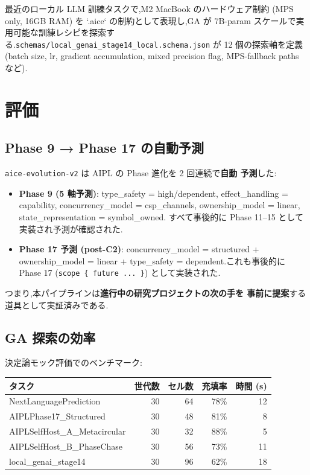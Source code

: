 \documentclass[11pt,a4paper]{article}
\newcommand{\code}[1]{\texttt{\small #1}}
\begin{document}
最近のローカル LLM 訓練タスクで,M2 MacBook のハードウェア制約
(MPS only, 16GB RAM) を `.aice` の制約として表現し,GA が 7B-param
スケールで実用可能な訓練レシピを探索する.\code{schemas/local\_genai\_stage14\_local.schema.json}
が 12 個の探索軸を定義 (batch size, lr, gradient accumulation,
mixed precision flag, MPS-fallback paths など).

\section{評価}
\label{sec:eval}

\subsection{Phase 9 → Phase 17 の自動予測}

\code{aice-evolution-v2} は AIPL の Phase 進化を 2 回連続で\textbf{自動
予測}した:

\begin{itemize}[leftmargin=*,itemsep=0pt]
  \item \textbf{Phase 9 (5 軸予測)}: type\_safety = high/dependent,
    effect\_handling = capability, concurrency\_model = csp\_channels,
    ownership\_model = linear, state\_representation = symbol\_owned.
    すべて事後的に Phase 11--15 として実装され予測が確認された.
  \item \textbf{Phase 17 予測 (post-C2)}: concurrency\_model = structured +
    ownership\_model = linear + type\_safety = dependent.これも事後的に
    Phase 17 (\code{scope \{ future ... \}}) として実装された.
\end{itemize}

つまり,本パイプラインは\textbf{進行中の研究プロジェクトの次の手を
事前に提案}する道具として実証済みである.

\subsection{GA 探索の効率}

決定論モック評価でのベンチマーク:

\begin{tabularx}{\linewidth}{l r r r r}
  \toprule
  タスク & 世代数 & セル数 & 充填率 & 時間 (s) \\
  \midrule
  NextLanguagePrediction       & 30 & 64 & 78\% & 12 \\
  AIPLPhase17\_Structured       & 30 & 48 & 81\% & 8 \\
  AIPLSelfHost\_A\_Metacircular & 30 & 32 & 88\% & 5 \\
  AIPLSelfHost\_B\_PhaseChase   & 30 & 56 & 73\% & 11 \\
  local\_genai\_stage14         & 30 & 96 & 62\% & 18 \\
  \bottomrule
\end{tabularx}
\end{document}
